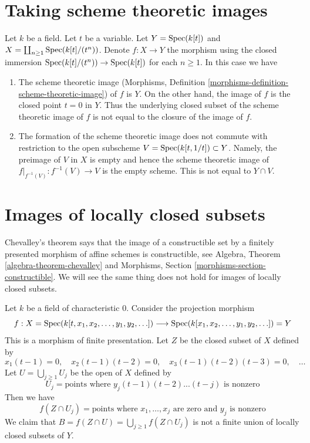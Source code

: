 \section{Taking scheme theoretic images}
\label{section-scheme-theoretic-image}

\noindent
Let $k$ be a field. Let $t$ be a variable. Let $Y = \mathop{\mathrm{Spec}}(k[t])$
and $X = \coprod_{n \geq 1} \mathop{\mathrm{Spec}}(k[t]/(t^n))$. Denote
$f : X \to Y$ the morphism
using the closed immersion $\mathop{\mathrm{Spec}}(k[t]/(t^n)) \to \mathop{\mathrm{Spec}}(k[t])$
for each $n \geq 1$. In this case we have
\begin{enumerate}
\item The scheme theoretic image
(Morphisms, Definition \ref{morphisms-definition-scheme-theoretic-image})
of $f$ is $Y$. On the other hand, the image of $f$ is the closed
point $t = 0$ in $Y$. Thus the underlying closed subset of the
scheme theoretic image of $f$
is not equal to the closure of the image of $f$.
\item The formation of the scheme theoretic image does not commute
with restriction to the open subscheme $V = \mathop{\mathrm{Spec}}(k[t, 1/t]) \subset Y$.
Namely, the preimage of $V$ in $X$ is empty and hence the scheme theoretic
image of $f|_{f^{-1}(V)} : f^{-1}(V) \to V$ is the empty scheme.
This is not equal to $Y \cap V$.
\end{enumerate}




\section{Images of locally closed subsets}
\label{section-non-chevalley}

\noindent
Chevalley's theorem says that the image of a constructible set
by a finitely presented morphism of affine schemes is constructible, see
Algebra, Theorem \ref{algebra-theorem-chevalley} and
Morphisms, Section \ref{morphisms-section-constructible}.
We will see the same thing does not hold
for images of locally closed subsets.

\medskip\noindent
Let $k$ be a field of characteristic $0$. Consider the projection morphism
$$
f :
X = \mathop{\mathrm{Spec}}(k[t, x_1, x_2, \ldots, y_1, y_2, \ldots])
\longrightarrow
\mathop{\mathrm{Spec}}(k[x_1, x_2, \ldots, y_1, y_2, \ldots]) = Y
$$
This is a morphism of finite presentation.
Let $Z$ be the closed subset of $X$ defined by
$$
x_1(t - 1) = 0,\quad
x_2(t - 1)(t - 2) = 0,\quad
x_3(t - 1)(t - 2)(t - 3) = 0,\quad \ldots
$$
Let $U = \bigcup_{j \geq 1} U_j$ be the open of $X$ defined by
$$
U_j = \text{points where }y_j(t - 1)(t - 2) ... (t - j)\text{ is nonzero}
$$
Then we have
$$
f(Z \cap U_j) =
\text{points where }x_1, \ldots, x_j\text{ are zero and }y_j\text{ is nonzero}
$$
We claim that $B = f(Z \cap U) = \bigcup_{j \geq 1} f(Z \cap U_j)$ is
not a finite union of locally closed subsets of $Y$.

